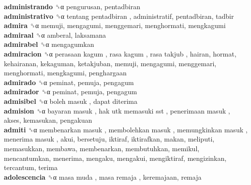 \textbf{administrando} ␝α  pengurusan, pentadbiran  \\
\textbf{administrativo} ␝α   tentang pentadbiran , administratif, pentadbiran, tadbir  \\
\textbf{admira} ␝α  memuji, mengagumi, menggemari, menghormati, mengkagumi  \\
\textbf{admiraal} ␝α  amberal, laksamana  \\
\textbf{admirabel} ␝α  mengagumkan  \\
\textbf{admiracion} ␝α   perasaan kagum ,  rasa kagum ,  rasa takjub , hairan, hormat, kehairanan, kekaguman, ketakjuban, memuji, mengagumi, menggemari, menghormati, mengkagumi, penghargaan  \\
\textbf{admirado} ␝α  peminat, pemuja, pengagum  \\
\textbf{admirador} ␝α  peminat, pemuja, pengagum  \\
\textbf{admisibel} ␝α   boleh masuk ,  dapat diterima   \\
\textbf{admision} ␝α   bayaran masuk ,  hak utk memasuki sst ,  penerimaan masuk , akses, kemasukan, pengakuan  \\
\textbf{admiti} ␝α   membenarkan masuk ,  membolehkan masuk ,  memungkinkan masuk ,  menerima masuk , akui, bersetuju, iktiraf, iktirafkan, makan, meliputi, memasukkan, membawa, membenarkan, membutuhkan, memikul, mencantumkan, menerima, mengaku, mengakui, mengiktiraf, mengizinkan, tercantum, terima  \\
\textbf{adolescencia} ␝α   masa muda ,  masa remaja , keremajaan, remaja  \\
